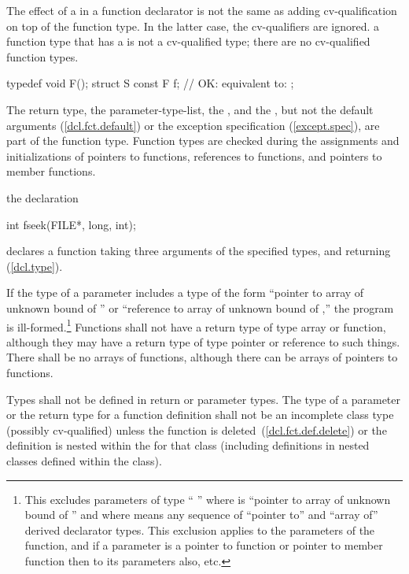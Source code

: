 The effect of a
in a function declarator is not the same as
adding cv-qualification on top of the function type.
In the latter case, the cv-qualifiers are ignored.
\enternote a function type that has a  is not a
cv-qualified type; there are no cv-qualified function types. \exitnote
\enterexample

\begin{codeblock}
typedef void F();
struct S {
  const F f;        // OK: equivalent to: 
};
\end{codeblock}
\exitexample
The return type, the parameter-type-list, the , and the
,
but not the default arguments (\ref{dcl.fct.default})
or the exception specification (\ref{except.spec}),
are part of the function type.
\enternote
Function types are checked during the assignments and initializations of
pointers to functions, references to functions, and pointers to member functions.
\exitnote

\pnum
\enterexample
{}%
the declaration

\begin{codeblock}
int fseek(FILE*, long, int);
\end{codeblock}

declares a function taking three arguments of the specified types,
and returning
(\ref{dcl.type}).
\exitexample

\pnum
If the type of a parameter includes a type of the form
``pointer to array of unknown bound of '' or
``reference to array of unknown bound of ,''
the program is ill-formed.\footnote{This excludes parameters of type
`` '' where  is
``pointer to array of unknown bound of '' and where
 means any sequence of ``pointer to'' and
``array of'' derived declarator types.
This exclusion applies to the parameters of the function,
and if a parameter is a pointer to function
or pointer to member function then to its
parameters also, etc.
}
%
%
Functions shall not have a return type of type array or function,
although they may have a return type of type pointer or reference to such things.
There shall be no arrays of functions, although there can be arrays of pointers
to functions.

\pnum
Types shall not be defined in return or parameter types.
The type of a parameter or the return type for a function
definition shall not be an incomplete class type (possibly
cv-qualified) unless the function is
deleted~(\ref{dcl.fct.def.delete}) or the definition is nested
within the
for that class (including definitions in nested classes
defined within the class).

